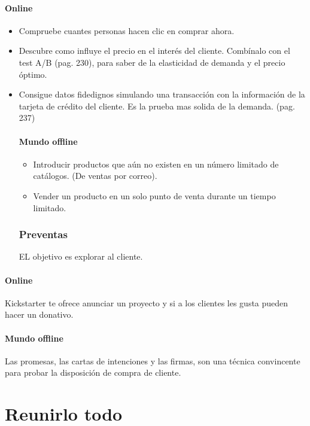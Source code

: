 \documentclass[11pt]{book}
\begin{document}
\paragraph{Online}
\begin{itemize}
\item Compruebe cuantes personas hacen clic en comprar ahora.\
\item Descubre como influye el precio en el interés del cliente. Combínalo con el test A/B (pag. 230), para saber de la elasticidad de demanda y el precio óptimo.
\item Consigue datos fidedignos simulando una transacción con la información de la tarjeta de crédito del cliente. Es la prueba mas solida de la demanda. (pag. 237)
\paragraph{Mundo offline}
\begin{itemize}
\item Introducir productos que aún no existen en un número limitado de catálogos. (De ventas por correo).
\item Vender un producto en un solo punto de venta durante un tiempo limitado.
\end{itemize}
\subsubsection{Preventas}
EL objetivo es explorar al cliente. 
\end{itemize}
\paragraph{Online}
Kickstarter te ofrece anunciar un proyecto y si a los clientes les gusta pueden hacer un donativo. 
\paragraph{Mundo offline}
Las promesas, las cartas de intenciones y las firmas, son una técnica convincente para probar la disposición de compra de cliente.
\section{Reunirlo todo}
\end{document}
